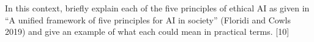 \documentclass[a4paper, 11pt]{article}
\begin{document}
In this context, briefly explain each of the five principles of ethical AI as given in ``A unified framework of five principles for AI in society'' (Floridi and Cowls 2019)  and give an example of what each could mean in practical terms. [10] 
%
%
%
%
%
%
%
%
%
%
%
%
%
%
%
%
%
%
%
%
%
%
\end{document}
